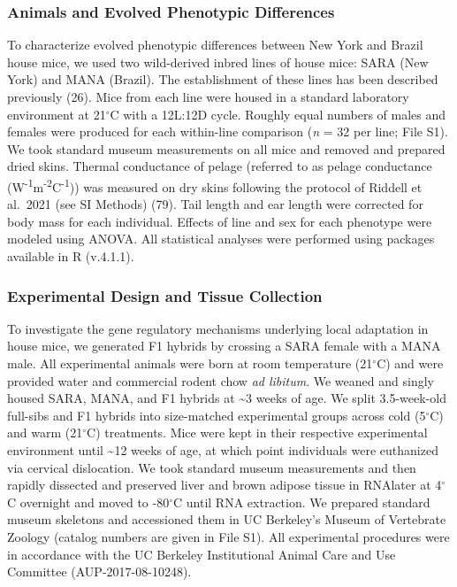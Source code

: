 \documentclass[9pt,twocolumn,twoside,lineno]{pnas-new}
\begin{document}
\hypertarget{animals-and-evolved-phenotypic-differences}{%
\subsubsection*{Animals and Evolved Phenotypic
Differences}\label{animals-and-evolved-phenotypic-differences}}

To characterize evolved phenotypic differences between New York and
Brazil house mice, we used two wild-derived inbred lines of house mice:
SARA (New York) and MANA (Brazil). The establishment of these lines has
been described previously (26). Mice from each line were housed in a
standard laboratory environment at 21\(^{\circ}\)C with a 12L:12D cycle.
Roughly equal numbers of males and females were produced for each
within-line comparison (\emph{n} = 32 per line; File S1). We took
standard museum measurements on all mice and removed and prepared dried
skins. Thermal conductance of pelage (referred to as pelage conductance
(W\textsuperscript{-1}m\textsuperscript{-2}C\textsuperscript{-1})) was
measured on dry skins following the protocol of Riddell et al.~2021 (see
SI Methods) (79). Tail length and ear length were corrected for body
mass for each individual. Effects of line and sex for each phenotype
were modeled using ANOVA. All statistical analyses were performed using
packages available in R (v.4.1.1).

\hypertarget{experimental-design-and-tissue-collection}{%
\subsubsection*{Experimental Design and Tissue
Collection}\label{experimental-design-and-tissue-collection}}

To investigate the gene regulatory mechanisms underlying local
adaptation in house mice, we generated F1 hybrids by crossing a SARA
female with a MANA male. All experimental animals were born at room
temperature (21\(^{\circ}\)C) and were provided water and commercial
rodent chow \emph{ad libitum}. We weaned and singly housed SARA, MANA,
and F1 hybrids at \textasciitilde3 weeks of age. We split 3.5-week-old
full-sibs and F1 hybrids into size-matched experimental groups across
cold (5\(^{\circ}\)C) and warm (21\(^{\circ}\)C) treatments. Mice were
kept in their respective experimental environment until
\textasciitilde12 weeks of age, at which point individuals were
euthanized via cervical dislocation. We took standard museum
measurements and then rapidly dissected and preserved liver and brown
adipose tissue in RNAlater at 4\(^{\circ}\)C overnight and moved to
-80\(^{\circ}\)C until RNA extraction. We prepared standard museum
skeletons and accessioned them in UC Berkeley's Museum of Vertebrate
Zoology (catalog numbers are given in File S1). All experimental
procedures were in accordance with the UC Berkeley Institutional Animal
Care and Use Committee (AUP-2017-08-10248).
\end{document}
